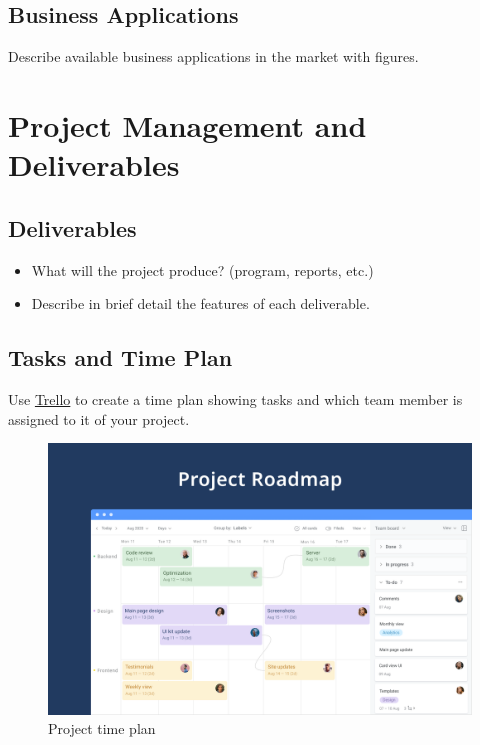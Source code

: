 \documentclass[hidelinks,a4paper,12pt]{article}
\begin{document}
\subsection{Business Applications}
Describe available business applications in the market with figures.





\section{Project Management and Deliverables}
\subsection{Deliverables}
\begin{itemize}
\item What will the project produce? (program, reports, etc.)
\item Describe in brief detail the features of each deliverable.
\end{itemize}
\subsection{Tasks and Time Plan}
Use \textcolor{blue}{\href{https://trello.com/power-ups/58bd1f9aca72f48c8900574f}{Trello}} to create a time plan showing tasks and which team member is assigned to it of your project.\\ 

\begin{figure}[h]
\centering
\includegraphics[width=0.8\linewidth]{images/trello_time_plan.png}
\caption{Project time plan}
\label{fig:timeplan}
\end{figure}
\newpage

\printbibliography
\end{document}
